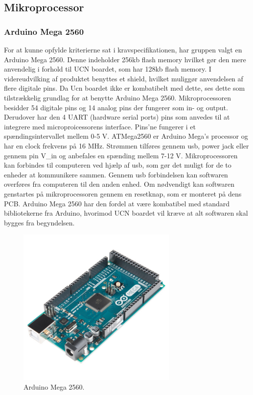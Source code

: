 \subsection{Mikroprocessor}
\subsubsection{Arduino Mega 2560}
For at kunne opfylde kriterierne sat i kravspecifikationen, har gruppen valgt en Arduino Mega 2560. Denne indeholder 256kb flash memory hvilket gør den mere anvendelig i forhold til UCN boardet, som har 128kb flash memory. I videreudvilking af produktet benyttes et shield, hvilket muliggør anvendelsen af flere digitale pins. Da Ucn boardet ikke er kombatibelt med dette, ses dette som tilstrækkelig grundlag for at benytte Arduino Mega 2560. 
\newline
Mikroprocessoren besidder 54 digitale pins og 14 analog pins der fungerer som in- og output. Derudover har den 4 UART (hardware serial ports) pins som anvedes til at integrere med microproicessorens interface. Pins'ne fungerer i et spændingsintervallet mellem 0-5 V. 
\newline
ATMega2560 er Arduino Mega's processor og har en clock frekvens på 16 MHz. Strømmen tilføres gennem usb, power jack eller gennem pin V_{in} og anbefales en spænding mellem 7-12 V. 
\newline
Mikroprocessoren kan forbindes til computeren ved hjælp af usb, som gør det muligt for de to enheder at kommunikere sammen. Gennem usb forbindelsen kan softwaren overføres fra computeren til den anden enhed. Om nødvendigt kan softwaren genstartes på mikroprocessoren gennem en resetknap, som er monteret på dens PCB.
\newline 
Arduino Mega 2560 har den fordel at være kombatibel med standard bibliotekerne fra Arduino, hvorimod UCN boardet vil kræve at alt softwaren skal bygges fra begyndelsen.

\begin{figure}[h!]
  \centering
  \includegraphics[width=0.7\textwidth]{figures/arduinoMega.jpg}
  \caption{Arduino Mega 2560.}
  \label{tempgraf_eksempel1}
\end{figure} 


\newpage




